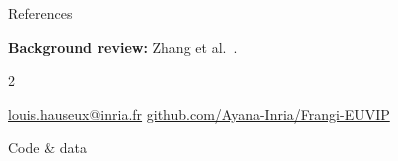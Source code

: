 \documentclass[final]{beamer}
\newcommand{\captiontext}{\fontsize{24}{28}\selectfont}
\begin{document}
\begin{frame}[t]
\begin{block}{References}
\begin{minipage}[c]{0.80\linewidth}
{\fontsize{18}{21}\selectfont\RaggedRight
\hypersetup{urlcolor=black}
\setlength{\columnsep}{0.8cm}\setlength{\multicolsep}{0pt}
\textbf{Background review:} Zhang et al.~\cite{zhang2025review}.\par\smallskip
\begin{multicols}{2}


\end{multicols}
\par\smallskip
\href{mailto:louis.hauseux@inria.fr}{louis.hauseux@inria.fr}\quad\textbullet\quad
\href{https://github.com/Ayana-Inria/Frangi-EUVIP}{github.com/Ayana-Inria/Frangi-EUVIP}}
\end{minipage}\hfill
\begin{minipage}[c]{0.17\linewidth}\centering
\href{https://github.com/Ayana-Inria/Frangi-EUVIP}{}
\par{\captiontext Code \& data}
\end{minipage}
\end{block}
\end{frame}
\end{document}
